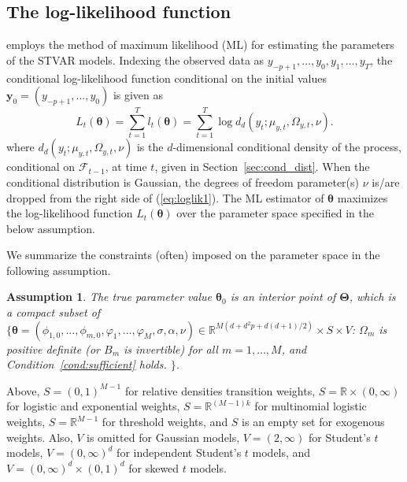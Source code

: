 \documentclass[nojss]{jss}
\newtheorem{assumption}{Assumption}
\begin{document}
\subsection{The log-likelihood function}\label{sec:loglik}

 employs the method of maximum likelihood (ML) for estimating the parameters of the STVAR models. Indexing the observed data as $y_{-p+1},...,y_0,y_1,...,y_T$, the conditional log-likelihood function conditional on the initial values $\boldsymbol{y}_0=(y_{-p+1},...,y_0)$ is given as
\begin{equation}\label{eq:loglik1}
L_t(\boldsymbol{\theta})=\sum_{t=1}^T l_t(\boldsymbol{\theta}) = \sum_{t=1}^T \log d_d(y_t;\mu_{y,t},\Omega_{y,t},\nu).
\end{equation}
where $d_d(y_t;\mu_{y,t},\Omega_{y,t},\nu)$ is the $d$-dimensional conditional density of the process, conditional on $\mathcal{F}_{t-1}$, at time $t$, given in Section~\ref{sec:cond_dist}. When the conditional distribution is Gaussian, the degrees of freedom parameter(s) $\nu$ is/are dropped from the right side of (\ref{eq:loglik1}). The ML estimator of $\boldsymbol{\theta}$ maximizes the log-likelihood function $L_t(\boldsymbol{\theta})$ over the parameter space specified in the below assumption.

We summarize the constraints (often) imposed on the parameter space in the following assumption.
%
\begin{assumption}\label{as:mle}
The true parameter value $\boldsymbol{\theta}_0$ is an interior point of $\boldsymbol{\Theta}$, which is a compact subset of
$\lbrace \boldsymbol{\theta}=(\phi_{1,0},...,\phi_{m,0},\varphi_1,...,\varphi_M,\sigma,\alpha,\nu)\in\mathbb{R}^{M(d + d^2p + d(d+1)/2)}\times S\times V$: $\Omega_m$ is positive definite (or $B_m$ is invertible) for all $m=1,...,M$, and Condition~\ref{cond:sufficient} holds.
$\rbrace$.
\end{assumption}
%
Above, $S=(0,1)^{M-1}$ for relative densities transition weights, $S=\mathbb{R}\times (0,\infty)$ for logistic and exponential weights, $S=\mathbb{R}^{(M-1)k}$ for multinomial logistic weights, $S=\mathbb{R}^{M-1}$ for threshold weights, and $S$ is an empty set for exogenous weights. Also, $V$ is omitted for Gaussian models, $V=(2, \infty)$ for Student's $t$ models, $V=(0, \infty)^d$ for independent Student's $t$ models, and $V=(0, \infty)^d\times (0,1)^d$ for skewed $t$ models.
\end{document}
